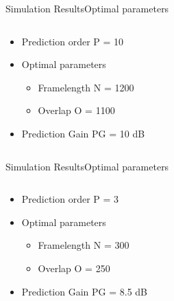 \begin{frame}{Simulation Results}{Optimal parameters}		
\begin{columns}
	\begin{column}{0.4\textwidth}
	\begin{itemize}
		\item Prediction order P = 10
		\item Optimal parameters
		\begin{itemize}
			\item Framelength N = 1200
			\item Overlap O = 1100
		\end{itemize}
		\item Prediction Gain PG = 10 dB
	\end{itemize}
	\end{column}
	\begin{column}{0.6\textwidth} 
		\resizebox{0.9\columnwidth}{!}{		
			}
	\end{column}
\end{columns}
\end{frame}

\begin{frame}{Simulation Results}{Optimal parameters}		
\begin{columns}
	\begin{column}{0.4\textwidth}
	\begin{itemize}
		\item Prediction order P = 3
		\item Optimal parameters
		\begin{itemize}
			\item Framelength N = 300
			\item Overlap O = 250
		\end{itemize}
		\item Prediction Gain PG = 8.5 dB
	\end{itemize}
	\end{column}
	\begin{column}{0.6\textwidth} 
		\resizebox{0.9\columnwidth}{!}{		
			}
	\end{column}
\end{columns}
\end{frame}


